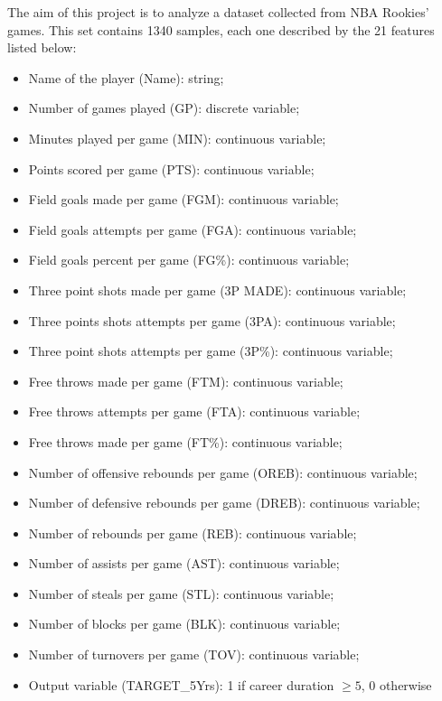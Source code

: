 The aim of this project is to analyze a dataset collected from NBA Rookies' games. This set contains 1340 samples, each one described by the 21 features listed below: 
\begin{itemize}
	\item Name of the player (Name): string;
	\item Number of games played (GP): discrete variable;
	\item Minutes played per game (MIN): continuous variable;
	\item Points scored per game (PTS): continuous variable;
	\item Field goals made per game (FGM): continuous variable;
	\item Field goals attempts per game (FGA): continuous variable;
	\item Field goals percent per game (FG\%): continuous variable;
	\item Three point shots made per game (3P MADE): continuous variable;
	\item Three points shots attempts per game (3PA): continuous variable;
	\item Three point shots attempts per game (3P\%): continuous variable;
	\item Free throws made per game (FTM): continuous variable;
	\item Free throws attempts per game (FTA): continuous variable;
	\item Free throws made per game (FT\%): continuous variable;
	\item Number of offensive rebounds per game (OREB): continuous variable;
	\item Number of defensive rebounds per game (DREB): continuous variable;
	\item Number of rebounds per game (REB): continuous variable;
	\item Number of assists per game (AST): continuous variable;
	\item Number of steals per game (STL): continuous variable;
	\item Number of blocks per game (BLK): continuous variable;
	\item Number of turnovers per game (TOV): continuous variable;
	\item Output variable (TARGET\_5Yrs): 1 if career duration $\geq 5$, 0 otherwise\\
\end{itemize} 

